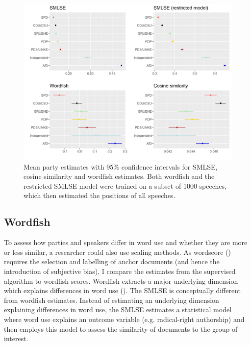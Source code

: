 \documentclass{article}
\begin{document}
\begin{figure}
    \centering
    \includegraphics[width = \textwidth]{DE/vis/similarity_pts.jpg}
    \caption{Mean party estimates with 95\% confidence intervals for SMLSE, cosine similarity and wordfish estimates. Both wordfish and the restricted SMLSE model were trained on a subset of 1000 speeches, which then estimated the positions of all speeches.}
    \label{fig:comp}
\end{figure}

\subsection{Wordfish}

To assess how parties and speakers differ in word use and whether they are more or less similar, a researcher could also use scaling methods. As wordscore (\cite{Laver2003}) requires the selection and labelling of anchor documents (and hence the introduction of subjective bias), I compare the estimates from the supervised algorithm to wordfish-scores. Wordfish extracts a major underlying dimension which explains differences in word use (\cite{Slapin2008}). The SMLSE is conceptually different from wordfish estimates. Instead of estimating an underlying dimension explaining differences in word use, the SMLSE estimates a statistical model where word use explains an outcome variable (e.g. radical-right authorship) and then employs this model to assess the similarity of documents to the group of interest. \par
\end{document}
